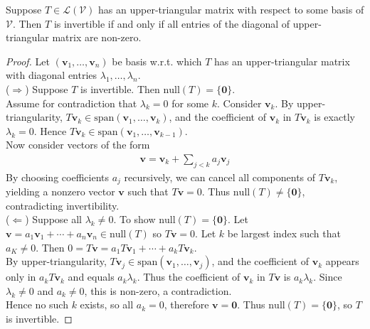 \begin{proposition} \label{prop:uppertrianginvertibleiifalldiagnonzero} Suppose $T \in \mathcal{L}(\mathcal{V})$ has an upper-triangular matrix with respect to some basis of $\mathcal{V}$. Then $T$ is invertible if and only if all entries of the diagonal of upper-triangular matrix are non-zero.
\begin{proof} Let $(\mathbf{v}_1, \ldots, \mathbf{v}_n)$ be basis w.r.t. which $T$ has an upper-triangular matrix with diagonal entries $\lambda_1, \ldots, \lambda_n$.\\
($\Rightarrow$) Suppose $T$ is invertible. Then $\text{null}(T) = \{ \mathbf{0} \}$.\\
Assume for contradiction that $\lambda_k = 0$ for some $k$. Consider $\mathbf{v}_k$. By upper-triangularity, $T \mathbf{v}_k \in \text{span}(\mathbf{v}_1, \ldots, \mathbf{v}_k)$, and the coefficient of $\mathbf{v}_k$ in $T \mathbf{v}_k$ is exactly $\lambda_k = 0$. Hence $T \mathbf{v}_k \in \text{span}(\mathbf{v}_1, \ldots, \mathbf{v}_{k-1})$.\\
Now consider vectors of the form
\begin{align}
\mathbf{v} = \mathbf{v}_k + \sum\limits_{j < k} a_j \mathbf{v}_j \nonumber
\end{align}
By choosing coefficients $a_j$ recursively, we can cancel all components of $T \mathbf{v}_k$, yielding a nonzero vector $\mathbf{v}$ such that $T \mathbf{v} = 0$. Thus $\text{null}(T) \neq \{ \mathbf{0} \}$, contradicting invertibility.\\
($\Leftarrow$) Suppose all $\lambda_k \neq 0$. To show $\text{null}(T) = \{ \mathbf{0} \}$. Let $\mathbf{v} = a_1 \mathbf{v}_1 + \cdots + a_n \mathbf{v}_n \in \text{null}(T)$ so $T \mathbf{v} = 0$. Let $k$ be largest index such that $a_K \neq 0$. Then $0 = T \mathbf{v} = a_1 T \mathbf{v}_1 + \cdots + a_k T \mathbf{v}_k$.\\
By upper-triangularity, $T \mathbf{v}_j \in \text{span}(\mathbf{v}_1, \ldots, \mathbf{v}_j)$, and the coefficient of $\mathbf{v}_k$ appears only in $a_k T \mathbf{v}_k$ and equals $a_k \lambda_k$. Thus the coefficient of $\mathbf{v}_k$ in $T \mathbf{v}$ is $a_k \lambda_k$. Since $\lambda_k \neq 0$ and $a_k \neq 0$, this is non-zero, a contradiction.\\
Hence no such $k$ exists, so all $a_k = 0$, therefore $\mathbf{v} = \mathbf{0}$. Thus $\text{null}(T) = \{ \mathbf{0} \}$, so $T$ is invertible.
\end{proof}
\end{proposition}

